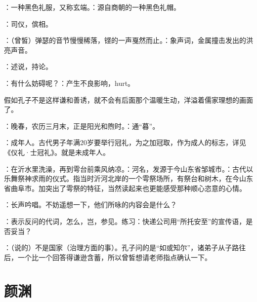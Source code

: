 {：一种黑色礼服，又称玄端。：源自商朝的一种黑色礼帽。

\item {}：司仪，傧相。
\item {}：（曾皙）弹瑟的音节慢慢稀落，铿的一声戛然而止。：象声词，金属撞击发出的洪亮声音。
\item {}：述说，持论。%
\item {}：有什么妨碍呢？：产生不良影响，hurt。

假如孔子不是这样谦和善诱，就不会有后面那个温暖生动，洋溢着儒家理想的画面了。

\item {}：晚春，农历三月末，正是阳光和煦时。：通“暮”。

\item {}：成年人。古代男子年满20岁要举行冠礼，为之加冠取，作为成人的标志，详见《仪礼·士冠礼》。就是未成年人。

\item {}：在沂水里洗澡，再到雩台前乘风纳凉。：河名，发源于今山东省邹城市。：古代以乐舞祭神求雨的仪式。指当时沂河北岸的一个雩祭场所，有祭台和树木，在今山东省曲阜市。加突出了雩祭的特征，当然读起来也更能感受那种顺心恣意的心情。%

\item {}：长声吟唱。不妨遥想一下，他们所咏的内容会是什么？

\item {}：表示反问的代词，怎么，岂，参见。练习：快递公司用“所托安至”的宣传语，是否妥当？

\item {}：（说的）不是国家（治理方面的事）。孔子问的是“如或知尔”，诸弟子从子路往后，一个比一个回答得谦逊含蓄，所以曾皙想请老师指点确认一下。
}
{}



\chapter{颜渊}

